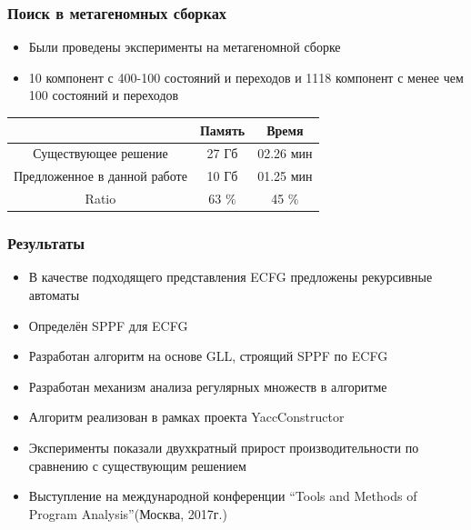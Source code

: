 \documentclass{beamer}
\begin{document}
	\begin{frame} 
		\frametitle{Поиск в метагеномных сборках} 
        \begin{itemize}
            \item Были проведены эксперименты на метагеномной сборке
            \item 10 компонент с 400-100 состояний и переходов и 1118 компонент с менее чем 100 состояний и переходов
        \end{itemize}
		\begin{center}
            
		\vspace{40pt}
		\begin{tabular}{ | c | c | c | }
			\hline
			             &  Память & Время   \\ \hline
			Существующее решение  &  27 Гб   & 02.26 мин \\ \hline
			Предложенное в данной работе &  10  Гб   &  01.25 мин \\ \hline \hline
			Ratio   &  63 $\%$     &  45 $\%$ \\ \hline
		\end{tabular}
		\end{center}
	\end{frame}

	\begin{frame} 
		\frametitle{Результаты}
		\begin{itemize}
			\item В качестве подходящего представления ECFG предложены рекурсивные автоматы
			\item Определён SPPF для ECFG
			\item Разработан алгоритм на основе GLL, строящий SPPF по ECFG
            \item Разработан механизм анализа регулярных множеств в алгоритме
			\item Алгоритм реализован в рамках проекта YaccConstructor
			\item Эксперименты показали двухкратный прирост производительности по сравнению с существующим решением 
			\item Выступление на международной конференции ``Tools and Methods of Program Analysis''(Москва, 2017г.)
		\end{itemize}		
	\end{frame}
\end{document}
